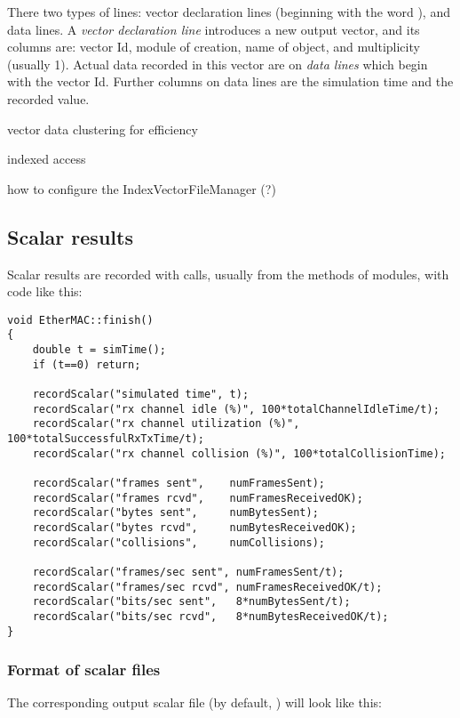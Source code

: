 There two types of lines: vector declaration lines (beginning with
the word ), and data lines.
A \textit{vector declaration line} introduces a new output vector, and
its columns are: vector Id, module of creation, name of 
object, and multiplicity (usually 1). Actual data recorded in this
vector are on \textit{data lines} which begin with the vector Id.
Further columns on data lines are the simulation time and the recorded value.

vector data clustering for efficiency

indexed access

how to configure the IndexVectorFileManager (?)


\subsection{Scalar results}

Scalar results are recorded with  calls,
usually from the  methods of modules, with code like this:

\begin{verbatim}
void EtherMAC::finish()
{
    double t = simTime();
    if (t==0) return;

    recordScalar("simulated time", t);
    recordScalar("rx channel idle (%)", 100*totalChannelIdleTime/t);
    recordScalar("rx channel utilization (%)", 100*totalSuccessfulRxTxTime/t);
    recordScalar("rx channel collision (%)", 100*totalCollisionTime);

    recordScalar("frames sent",    numFramesSent);
    recordScalar("frames rcvd",    numFramesReceivedOK);
    recordScalar("bytes sent",     numBytesSent);
    recordScalar("bytes rcvd",     numBytesReceivedOK);
    recordScalar("collisions",     numCollisions);

    recordScalar("frames/sec sent", numFramesSent/t);
    recordScalar("frames/sec rcvd", numFramesReceivedOK/t);
    recordScalar("bits/sec sent",   8*numBytesSent/t);
    recordScalar("bits/sec rcvd",   8*numBytesReceivedOK/t);
}
\end{verbatim}


\subsubsection{Format of scalar files}


The corresponding output scalar file (by default, )
will look like this:

